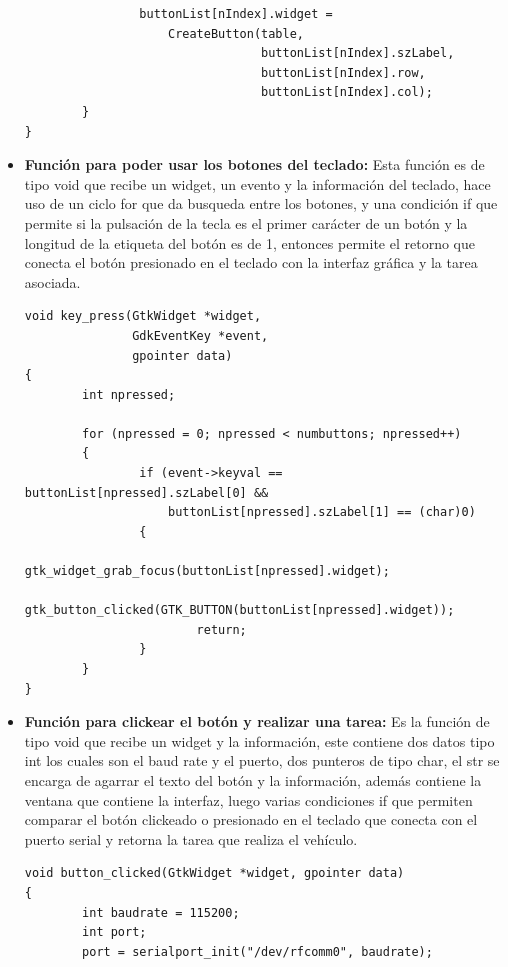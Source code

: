 \begin{itemize}
\begin{lstlisting}
                buttonList[nIndex].widget =
                    CreateButton(table,
                                 buttonList[nIndex].szLabel,
                                 buttonList[nIndex].row,
                                 buttonList[nIndex].col);
        }
}
\end{lstlisting}

 \item\textbf{Función para poder usar los botones del teclado:}
        Esta función es de tipo void que recibe un widget, un evento y la información del teclado, hace uso de un ciclo for que da busqueda entre los botones, y una condición if que permite si la pulsación de la tecla es el primer carácter de un botón y la longitud de la etiqueta del botón es de 1, entonces permite el retorno que conecta el botón presionado en el teclado con la interfaz gráfica y la tarea asociada.
    

\begin{lstlisting}
void key_press(GtkWidget *widget,
               GdkEventKey *event,
               gpointer data)
{
        int npressed;

        for (npressed = 0; npressed < numbuttons; npressed++)
        {
                if (event->keyval == buttonList[npressed].szLabel[0] &&
                    buttonList[npressed].szLabel[1] == (char)0)
                {
                        gtk_widget_grab_focus(buttonList[npressed].widget);
                        gtk_button_clicked(GTK_BUTTON(buttonList[npressed].widget));
                        return;
                }
        }
}

\end{lstlisting}

        \item\textbf{Función para clickear el botón y realizar una tarea:}
        Es la función de tipo void que recibe un widget y la información, este contiene dos datos tipo int los cuales son el baud rate y el puerto, dos punteros de tipo char, el str se encarga de agarrar el texto del botón y la información, además contiene la ventana que contiene la interfaz, luego varias condiciones if que permiten comparar el botón clickeado o presionado en el teclado que conecta con el puerto serial y retorna la tarea que realiza el vehículo. 
        
\begin{lstlisting}
void button_clicked(GtkWidget *widget, gpointer data)
{
        int baudrate = 115200;
        int port;
        port = serialport_init("/dev/rfcomm0", baudrate);


\end{lstlisting}
\end{itemize}
